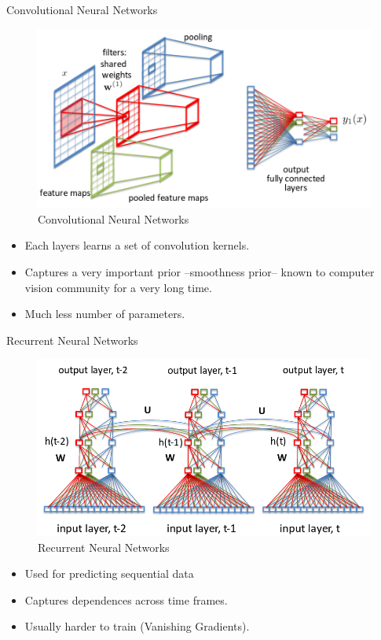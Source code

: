﻿\documentclass[table,aspectratio=43,mathserif,xcolor={usenames,dvipsnames,svgnames,table},10pt]{beamer}
\begin{document}
\begin{frame}{Convolutional Neural Networks}
\begin{figure}[h]
    \includegraphics[width=0.7\linewidth]{images/cnn.png}  
    \caption{Convolutional Neural Networks}
  \end{figure}
\begin{itemize}
\item<+-> Each layers learns a set of convolution kernels.
\item<+-> Captures a very important prior --smoothness prior-- known to computer vision community for a very long time.
\item<+-> Much less number of parameters.
\end{itemize}
\end{frame}

\begin{frame}{Recurrent Neural Networks}
\begin{figure}[h]
    \includegraphics[width=0.7\linewidth]{images/rnn.png}  
    \caption{Recurrent Neural Networks}
  \end{figure}
  
\begin{itemize}
\item<+-> Used for predicting sequential data 
\item<+-> Captures dependences across time frames.
\item<+-> Usually harder to train (Vanishing Gradients).
\end{itemize}

\end{frame}
\end{document}
